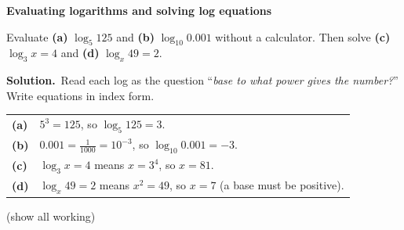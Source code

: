 \documentclass[11pt]{article}
\begin{document}
\begin{workedbox}

{\bfseries\color{chalkdk}Evaluating logarithms and solving log equations}\par\vspace{3pt}

Evaluate \textbf{(a)} $\log_5 125$ and \textbf{(b)} $\log_{10} 0.001$ without a calculator. Then solve \textbf{(c)} $\log_3 x=4$ and \textbf{(d)} $\log_x 49=2$.\par\vspace{2pt}

{\bfseries Solution.}\ Read each log as the question ``\emph{base to what power gives the number?}'' Write equations in index form.\par\vspace{2pt}
\begin{tabular}{@{}l@{\quad}l}
\textbf{(a)} & $5^3=125$, so $\log_5 125=3$.\\[2pt]
\textbf{(b)} & $0.001=\tfrac{1}{1000}=10^{-3}$, so $\log_{10}0.001=-3$.\\[2pt]
\textbf{(c)} & $\log_3 x=4$ means $x=3^4$, so $x=81$.\\[2pt]
\textbf{(d)} & $\log_x 49=2$ means $x^2=49$, so $x=7$ (a base must be positive).
\end{tabular}

\end{workedbox}
\newpage
{}\;\textcolor{inksoft}{\small(show all working)}\par\nopagebreak\vspace{2pt}
\end{document}
